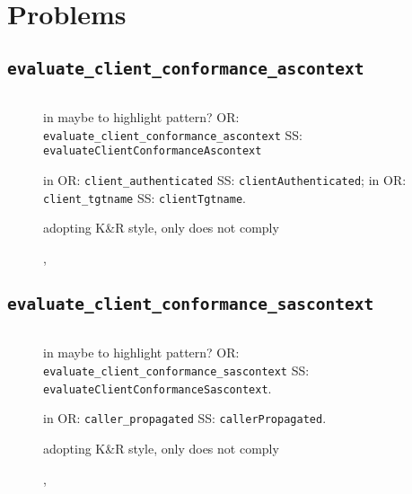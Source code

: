 \chapter{Problems}




\section{\normalfont\texttt{evaluate\_client\_conformance\_ascontext}}
\inputminted{java}{"./java/evaluate_client_conformance_ascontext.java"}

\begin{description}
	\item []
		in  maybe to highlight pattern? 
			OR: \texttt{evaluate\_client\_conformance\_ascontext}
			SS: \texttt{evaluateClientConformanceAscontext}
	\item []
		in  
			OR: \texttt{client\_authenticated}
			SS: \texttt{clientAuthenticated}; 
		in  
			OR: \texttt{client\_tgtname}
			SS: \texttt{clientTgtname}.
	\item []
		adopting K\&R style, only  does not comply
	\item [] , 

\end{description}






\clearpage
\section{\normalfont\texttt{evaluate\_client\_conformance\_sascontext}}
\inputminted{java}{"./java/evaluate_client_conformance_sascontext.java"}


\begin{description}
	\item [] 
		in  maybe to highlight pattern? 
			OR: \texttt{evaluate\_client\_conformance\_sascontext}
			SS: \texttt{evaluateClientConformanceSascontext}.
	\item [] 
		in  
			OR: \texttt{caller\_propagated}
			SS: \texttt{callerPropagated}.
	\item []
		adopting K\&R style, only  does not comply
	\item [] , 
\end{description}









